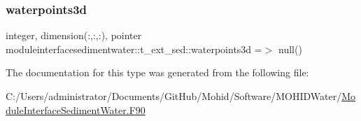 \subsubsection{\texorpdfstring{waterpoints3d}{waterpoints3d}}
{\footnotesize\ttfamily integer, dimension(\+:,\+:,\+:), pointer moduleinterfacesedimentwater\+::t\+\_\+ext\+\_\+sed\+::waterpoints3d =$>$ null()\hspace{0.3cm}{\ttfamily [private]}}



The documentation for this type was generated from the following file\+:\begin{DoxyCompactItemize}
\item 
C\+:/\+Users/administrator/\+Documents/\+Git\+Hub/\+Mohid/\+Software/\+M\+O\+H\+I\+D\+Water/\mbox{\hyperlink{_module_interface_sediment_water_8_f90}{Module\+Interface\+Sediment\+Water.\+F90}}\end{DoxyCompactItemize}
